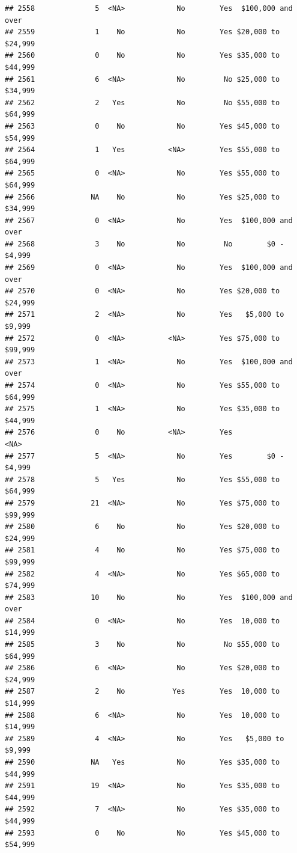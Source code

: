 \documentclass[man]{apa6}
\begin{document}
\begin{verbatim}
## 2558              5  <NA>            No        Yes  $100,000 and over
## 2559              1    No            No        Yes $20,000 to $24,999
## 2560              0    No            No        Yes $35,000 to $44,999
## 2561              6  <NA>            No         No $25,000 to $34,999
## 2562              2   Yes            No         No $55,000 to $64,999
## 2563              0    No            No        Yes $45,000 to $54,999
## 2564              1   Yes          <NA>        Yes $55,000 to $64,999
## 2565              0  <NA>            No        Yes $55,000 to $64,999
## 2566             NA    No            No        Yes $25,000 to $34,999
## 2567              0  <NA>            No        Yes  $100,000 and over
## 2568              3    No            No         No        $0 - $4,999
## 2569              0  <NA>            No        Yes  $100,000 and over
## 2570              0  <NA>            No        Yes $20,000 to $24,999
## 2571              2  <NA>            No        Yes   $5,000 to $9,999
## 2572              0  <NA>          <NA>        Yes $75,000 to $99,999
## 2573              1  <NA>            No        Yes  $100,000 and over
## 2574              0  <NA>            No        Yes $55,000 to $64,999
## 2575              1  <NA>            No        Yes $35,000 to $44,999
## 2576              0    No          <NA>        Yes               <NA>
## 2577              5  <NA>            No        Yes        $0 - $4,999
## 2578              5   Yes            No        Yes $55,000 to $64,999
## 2579             21  <NA>            No        Yes $75,000 to $99,999
## 2580              6    No            No        Yes $20,000 to $24,999
## 2581              4    No            No        Yes $75,000 to $99,999
## 2582              4  <NA>            No        Yes $65,000 to $74,999
## 2583             10    No            No        Yes  $100,000 and over
## 2584              0  <NA>            No        Yes  10,000 to $14,999
## 2585              3    No            No         No $55,000 to $64,999
## 2586              6  <NA>            No        Yes $20,000 to $24,999
## 2587              2    No           Yes        Yes  10,000 to $14,999
## 2588              6  <NA>            No        Yes  10,000 to $14,999
## 2589              4  <NA>            No        Yes   $5,000 to $9,999
## 2590             NA   Yes            No        Yes $35,000 to $44,999
## 2591             19  <NA>            No        Yes $35,000 to $44,999
## 2592              7  <NA>            No        Yes $35,000 to $44,999
## 2593              0    No            No        Yes $45,000 to $54,999

\end{verbatim}
\end{document}
